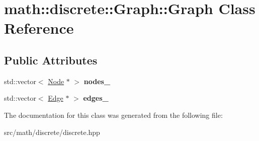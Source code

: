 \hypertarget{classmath_1_1discrete_1_1Graph_1_1Graph}{
\section{math::discrete::Graph::Graph Class Reference}
\label{classmath_1_1discrete_1_1Graph_1_1Graph}
}
\subsection*{Public Attributes}
\begin{DoxyCompactItemize}
\item 
\hypertarget{classmath_1_1discrete_1_1Graph_1_1Graph_a0a9fb8fc2e45aaa8b910a5b938bfbb9d}{
std::vector$<$ \hyperlink{classmath_1_1discrete_1_1Graph_1_1Node}{Node} $\ast$ $>$ {\bfseries nodes\_\-}}
\label{classmath_1_1discrete_1_1Graph_1_1Graph_a0a9fb8fc2e45aaa8b910a5b938bfbb9d}

\item 
\hypertarget{classmath_1_1discrete_1_1Graph_1_1Graph_aebb0a04782bc28e84f975acdb5d82b41}{
std::vector$<$ \hyperlink{classmath_1_1discrete_1_1Graph_1_1Edge}{Edge} $\ast$ $>$ {\bfseries edges\_\-}}
\label{classmath_1_1discrete_1_1Graph_1_1Graph_aebb0a04782bc28e84f975acdb5d82b41}

\end{DoxyCompactItemize}


The documentation for this class was generated from the following file:\begin{DoxyCompactItemize}
\item 
src/math/discrete/discrete.hpp\end{DoxyCompactItemize}
